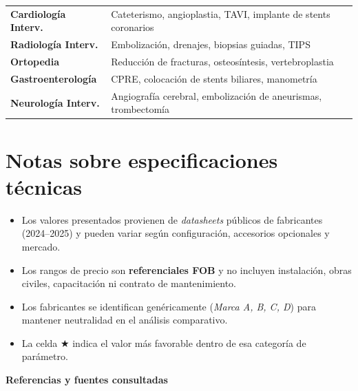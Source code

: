 \documentclass[11pt, a4paper]{article}
\begin{document}
\begin{clinicbox}
\begin{tabular}{@{}P{3.5cm} P{10cm}@{}}
\textbf{Cardiología Interv.}  & Cateterismo, angioplastia, TAVI, implante de stents coronarios \\[2pt]
\textbf{Radiología Interv.}   & Embolización, drenajes, biopsias guiadas, TIPS \\[2pt]
\textbf{Ortopedia}            & Reducción de fracturas, osteosíntesis, vertebroplastia \\[2pt]
\textbf{Gastroenterología}    & CPRE, colocación de stents biliares, manometría \\[2pt]
\textbf{Neurología Interv.}   & Angiografía cerebral, embolización de aneurismas, trombectomía \\
\end{tabular}
\end{clinicbox}

\newpage

\section*{Notas sobre especificaciones técnicas}

\begin{itemize}[leftmargin=*, itemsep=5pt]
  \item Los valores presentados provienen de \textit{datasheets} públicos de fabricantes
        (2024--2025) y pueden variar según configuración, accesorios opcionales y mercado.
  \item Los rangos de precio son \textbf{referenciales FOB} y no incluyen instalación,
        obras civiles, capacitación ni contrato de mantenimiento.
  \item Los fabricantes se identifican genéricamente (\textit{Marca A, B, C, D}) para
        mantener neutralidad en el análisis comparativo.
  \item La celda $\bigstar$ indica el valor más favorable dentro de esa categoría de
        parámetro.
\end{itemize}

\vspace{8pt}

\noindent\textbf{Referencias y fuentes consultadas}
\end{document}
